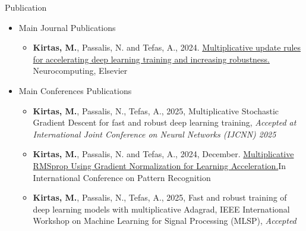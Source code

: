 \begin{frame}{Publication}
\begin{itemize}
    \item Main Journal Publications
     \begin{itemize}
        \item {\scriptsize \textbf{Kirtas, M.}, Passalis, N. and Tefas, A., 2024. \href{https://www.sciencedirect.com/science/article/abs/pii/S0925231224001231}{Multiplicative update rules for accelerating deep learning training and increasing     robustness.} Neurocomputing, Elsevier}
    \end{itemize}
    \item Main Conferences Publications 
    \begin{itemize} 
        \item {\scriptsize \textbf{Kirtas, M.}, Passalis, N., Tefas, A., 2025, Multiplicative Stochastic Gradient Descent for fast and robust deep learning training, \textit{Accepted at International Joint Conference on Neural Networks (IJCNN) 2025 }}
          \item {\scriptsize \textbf{Kirtas, M.}, Passalis, N. and Tefas, A., 2024, December. \href{https://link.springer.com/chapter/10.1007/978-3-031-78110-0_21}{Multiplicative RMSprop Using Gradient Normalization for Learning Acceleration.}In International Conference on Pattern Recognition}
          \item {\scriptsize \textbf{Kirtas, M.}, Passalis, N., Tefas, A., 2025, Fast and robust training of deep learning models with multiplicative Adagrad, IEEE International Workshop on Machine Learning for Signal Processing (MLSP), \textit{Accepted}}
    \end{itemize}
\end{itemize}
\end{frame}
